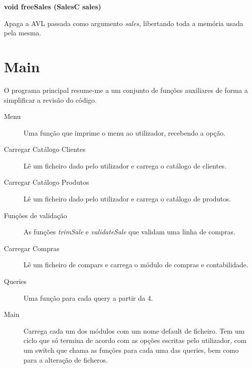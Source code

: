 \documentclass[10pt] {article}
\begin{document}
\noindent \textbf {void freeSales (SalesC sales)}
\par Apaga a AVL passada como argumento \emph{sales}, libertando toda a memória usada pela mesma. \\

\section{Main}
\par O programa principal resume-me a um conjunto de funções auxiliares de forma a simplificar a revisão do código.

\begin{description}
  \item[Menu] Uma função que imprime o menu ao utilizador, recebendo a opção.

  \item[Carregar Catálogo Clientes] Lê um ficheiro dado pelo utilizador e carrega o catálogo de clientes.

  \item[Carregar Catálogo Produtos] Lê um ficheiro dado pelo utilizador e carrega o catálogo de produtos.

  \item[Funções de validação] As funções \emph{trimSale} e \emph{validateSale} que validam uma linha de compras.

  \item[Carregar Compras] Lê um ficheiro de compars e carrega o módulo de compras e contabilidade.

  \item[Queries] Uma função para cada query a partir da 4.

  \item[Main] Carrega cada um dos módulos com um nome default de ficheiro. Tem um ciclo que só termina de acordo com as opções escritas pelo utilizador, com um switch que chama as funções para cada uma das queries, bem como para a alteração de ficheros.

\end{description}

\newpage
\end{document}
